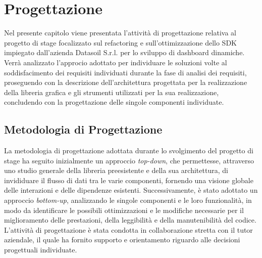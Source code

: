\chapter{Progettazione}
\label{chap:progettazione}
Nel presente capitolo viene presentata l'attività di progettazione relativa al progetto di stage focalizzato sul refactoring e
sull'ottimizzazione dello SDK impiegato dall'azienda Datasoil S.r.l. per lo sviluppo di dashboard dinamiche.
Verrà analizzato l'approcio adottato per individuare le soluzioni volte al soddisfacimento dei requisiti individuati durante
la fase di analisi dei requisiti, proseguendo con la descrizione dell'architettura progettata per la realizzazione della libreria grafica
e gli strumenti utilizzati per la sua realizzazione, concludendo con la progettazione delle singole componenti individuate.

\section{Metodologia di Progettazione}
La metodologia di progettazione adottata durante lo svolgimento del progetto di stage ha seguito inizialmente un approccio
\textit{top-down}, che permettesse, attraverso uno studio generale della libreria preesistente e della sua architettura, di invididuare
il flusso di dati tra le varie componenti, fornendo una visione globale delle interazioni e delle dipendenze esistenti.
Successivamente, è stato adottato un approccio \textit{bottom-up}, analizzando le singole componenti e le loro funzionalità,
in modo da identificare le possibili ottimizzazioni e le modifiche necessarie per il miglioramento delle prestazioni, della leggibilità e
della manutenibilità del codice.\newline
L'attività di progettazione è stata condotta in collaborazione stretta con il tutor aziendale, il quale ha fornito supporto e orientamento
riguardo alle decisioni progettuali individuate.

